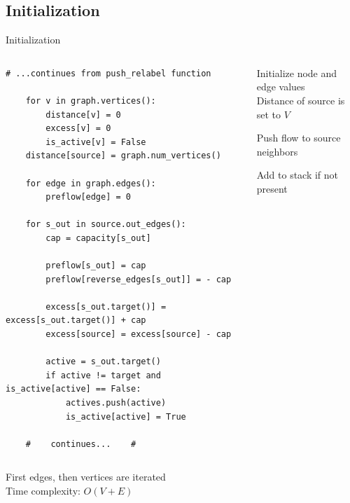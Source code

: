 \documentclass{beamer}
\begin{document}
\subsection{Initialization}
\begin{frame}[fragile]{Initialization}
    \begin{columns}[T]
        \begin{column}{0.55\textwidth}
            \begin{lstlisting}[emph={}]
    # ...continues from push_relabel function

    for v in graph.vertices():
        distance[v] = 0
        excess[v] = 0
        is_active[v] = False
    distance[source] = graph.num_vertices()

    for edge in graph.edges():
        preflow[edge] = 0

    for s_out in source.out_edges():
        cap = capacity[s_out]

        preflow[s_out] = cap
        preflow[reverse_edges[s_out]] = - cap

        excess[s_out.target()] = excess[s_out.target()] + cap
        excess[source] = excess[source] - cap

        active = s_out.target()
        if active != target and is_active[active] == False:
            actives.push(active)
            is_active[active] = True

    #    continues...    #
            \end{lstlisting}
        \end{column}

        \begin{column}{0.45\textwidth}
            \begin{sidecomment}
                \pause
                \vskip 53bp
                Initialize node and edge values
                \\Distance of source is set to $V$

                \pause
                \vskip 22bp
                Push flow to source neighbors

                \pause
                \vskip 53bp
                Add to stack if not present
            \end{sidecomment}
        \end{column}
    \end{columns}

    \pause
    \vspace*{\fill}
    First edges, then vertices are iterated
    \\Time complexity: $O(V+E)$
\end{frame}
\end{document}

